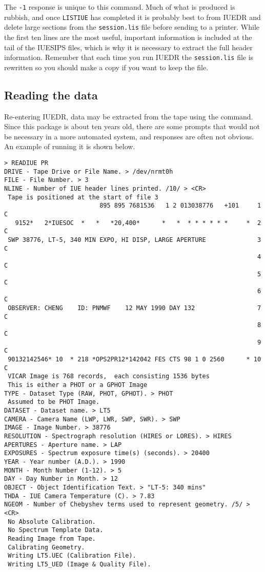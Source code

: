 The \verb+-1+ response is unique to this command.  Much of what is produced is
rubbish, and once \verb+LISTIUE+ has completed it is probably best
to  from IUEDR and delete large sections from
the \verb+session.lis+
file before sending to a printer.  While the first ten lines are the most
useful, important information is included at the tail of the IUESIPS files,
which is why it is necessary to extract the full header information.  Remember
that each time you run IUEDR the \verb+session.lis+ file is rewritten so you
should make a copy if you want to keep the file.

\subsection{Reading the data}

Re-entering IUEDR, data may be extracted from the tape using the
command.  Since this package is about ten years old, there are some prompts
that would not be necessary in a more automated system, and responses are
often not obvious.  An example of running it is shown below.

\begin{verbatim}
> READIUE PR
DRIVE - Tape Drive or File Name. > /dev/nrmt0h
FILE - File Number. > 3
NLINE - Number of IUE header lines printed. /10/ > <CR>
 Tape is positioned at the start of file 3
                          895 895 7681536   1 2 013038776   +101     1  C
   9152*   2*IUESOC  *   *   *20,400*      *   *  * * * * * *     *  2  C
 SWP 38776, LT-5, 340 MIN EXPO, HI DISP, LARGE APERTURE              3  C
                                                                     4  C
                                                                     5  C
                                                                     6  C
 OBSERVER: CHENG    ID: PNMWF    12 MAY 1990 DAY 132                 7  C
                                                                     8  C
                                                                     9  C
 90132142546* 10  * 218 *OPS2PR12*142042 FES CTS 98 1 0 2560      * 10  C
 VICAR Image is 768 records,  each consisting 1536 bytes
 This is either a PHOT or a GPHOT Image
TYPE - Dataset Type (RAW, PHOT, GPHOT). > PHOT
 Assumed to be PHOT Image.
DATASET - Dataset name. > LT5
CAMERA - Camera Name (LWP, LWR, SWP, SWR). > SWP
IMAGE - Image Number. > 38776
RESOLUTION - Spectrograph resolution (HIRES or LORES). > HIRES
APERTURES - Aperture name. > LAP
EXPOSURES - Spectrum exposure time(s) (seconds). > 20400
YEAR - Year number (A.D.). > 1990
MONTH - Month Number (1-12). > 5
DAY - Day Number in Month. > 12
OBJECT - Object Identification Text. > "LT-5: 340 mins"
THDA - IUE Camera Temperature (C). > 7.83
NGEOM - Number of Chebyshev terms used to represent geometry. /5/ > <CR>
 No Absolute Calibration.
 No Spectrum Template Data.
 Reading Image from Tape.
 Calibrating Geometry.
 Writing LT5.UEC (Calibration File).
 Writing LT5_UED (Image & Quality File).
\end{verbatim}

